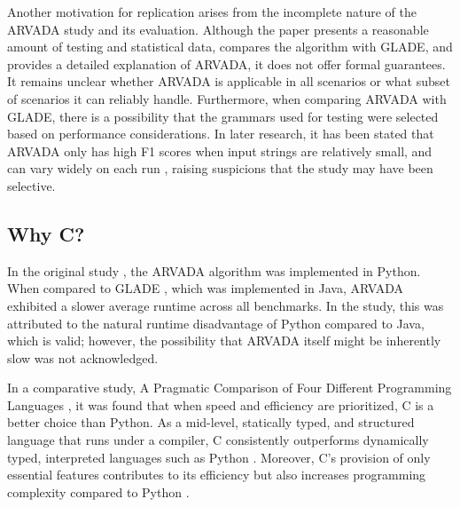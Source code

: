 \vspace{\baselineskip}

Another motivation for replication arises from the incomplete nature of the ARVADA study and its evaluation. Although the paper presents a reasonable amount of testing and statistical data, compares the algorithm with GLADE, and provides a detailed explanation of ARVADA, it does not offer formal guarantees. It remains unclear whether ARVADA is applicable in all scenarios or what subset of scenarios it can reliably handle. Furthermore, when comparing ARVADA with GLADE, there is a possibility that the grammars used for testing were selected based on performance considerations. In later research, it has been stated that ARVADA only has high F1 scores when input strings are relatively small, and can vary widely on each run \cite{arefinFastDeterministicBlackbox2024}, raising suspicions that the study may have been selective.

\subsection{Why C?}

In the original study \cite{kulkarniLearningHighlyRecursive2021}, the ARVADA algorithm was implemented in Python. When compared to GLADE \cite{bastaniSynthesizingProgramInput}, which was implemented in Java, ARVADA exhibited a slower average runtime across all benchmarks. In the study, this was attributed to the natural runtime disadvantage of Python compared to Java, which is valid; however, the possibility that ARVADA itself might be inherently slow was not acknowledged.

\vspace{\baselineskip}

In a comparative study, A Pragmatic Comparison of Four Different Programming Languages \cite{aliPragmaticComparisonFour2021}, it was found that when speed and efficiency are prioritized, C is a better choice than Python. As a mid-level, statically typed, and structured language that runs under a compiler, C consistently outperforms dynamically typed, interpreted languages such as Python \cite{kumarPythonLanguageComparison2022}. Moreover, C’s provision of only essential features contributes to its efficiency but also increases programming complexity compared to Python \cite{aliPragmaticComparisonFour2021, kumarPythonLanguageComparison2022}.

\vspace{\baselineskip}

